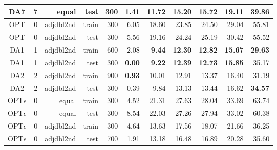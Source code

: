 \begin{table}[t]
\begin{minipage}{\textwidth}
\begin{tabular}{c@{}rrrrrrrrrr}
 DA7 & 7 & equal & test & 300 & 1.41 & 11.72 & 15.20 & 15.72 & 19.11 & 39.86 \\ 
 \midrule
 OPT & 0 & adjdbl2nd & train & 300 & 6.05 & 18.60 & 23.85 & 24.50 & 29.04 & 55.81 \\ 
 OPT & 0 & adjdbl2nd & test & 300 & 5.56 & 19.16 & 24.24 & 25.19 & 30.42 & 55.52 \\ 
 DA1 & 1 & adjdbl2nd & train & 600 & 2.08 & \textbf{9.44} & \textbf{12.30} &   \textbf{12.82} & \textbf{15.67} & \textbf{29.63} \\ 
 DA1 & 1 & adjdbl2nd & test & 300 & \textbf{0.00} & \textbf{9.22} & \textbf{12.39} & \textbf{12.73} & \textbf{15.85} & 35.17 \\ 
 DA2 & 2 & adjdbl2nd & train & 900 & \textbf{0.93} & 10.01 & 12.91 & 13.37 & 16.40 & 31.19 \\ 
 DA2 & 2 & adjdbl2nd & test & 300 & 0.39 & 9.84 & 13.13 & 13.44 & 16.62 & \textbf{34.57} \\ 
 \midrule
 OPT$\epsilon$ & 0 & equal & train & 300 & 4.52 & 21.31 & 27.63 & 28.04 & 
 33.69 & 63.74 \\ 
 OPT$\epsilon$ & 0 & equal & test & 300 & 8.54 & 22.03 & 27.26 & 27.94 & 33.02 
 & 60.38 \\ 
 OPT$\epsilon$ & 0 & adjdbl2nd & train & 300 & 4.64 & 13.63 & 17.56 & 18.07 & 21.66 & 36.25 \\ 
 OPT$\epsilon$ & 0 & adjdbl2nd & test & 700 & 1.91 & 13.18 & 16.48 & 16.89 & 20.28 & 35.60 \\   
  \bottomrule
\end{tabular}
\end{minipage}
\end{table}